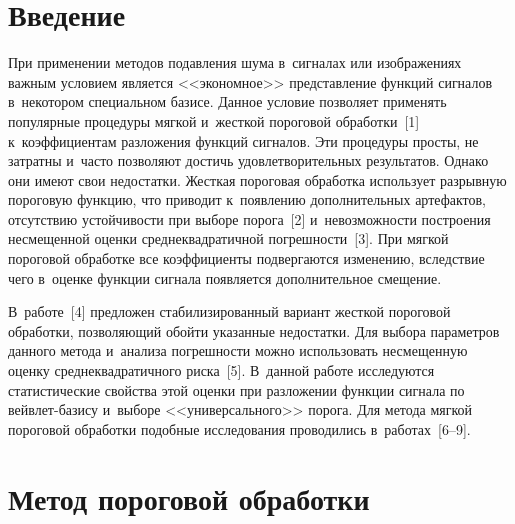
\thispagestyle{headings}

\begin{multicols}{2}

\label{st\stat}

\section{Введение}

При применении методов подавления шума в~сигналах или изображениях важным 
условием является <<экономное>> представление функций сигналов в~некотором 
специальном базисе. Данное условие позволяет применять популярные процедуры 
мягкой и~жесткой пороговой обработки~[1] к~коэффициентам разложения функций сигналов. 
Эти процедуры просты, не затратны и~часто позволяют достичь удовлетворительных 
результатов. Однако они имеют свои недостатки. Жесткая по\-роговая обработка использует 
разрывную пороговую функцию, что приводит к~появлению дополнительных артефактов, 
отсутствию устойчивости при выборе порога~[2] и~невозможности построения несмещенной 
оценки среднеквадратичной погрешности~[3]. При мягкой пороговой обработке все 
коэффициенты подвергаются изменению, вследствие чего в~оценке функции сигнала 
появляется дополнительное смещение. 

В~работе~[4] предложен стабилизированный 
вариант жесткой пороговой обработки, позволяющий обойти указанные недостатки. 
Для выбора па\-ра\-мет\-ров данного метода и~анализа погрешности можно использовать 
несмещенную оценку среднеквадратичного риска~[5]. В~данной работе исследуются 
статистические свойства этой оценки при разложении функции сигнала по вейв\-лет-ба\-зи\-су 
и~выборе <<универсального>> порога. Для метода мягкой пороговой обработки подобные 
исследования проводились в~работах~[6--9].


\section{Метод пороговой обработки}


\end{multicols}
